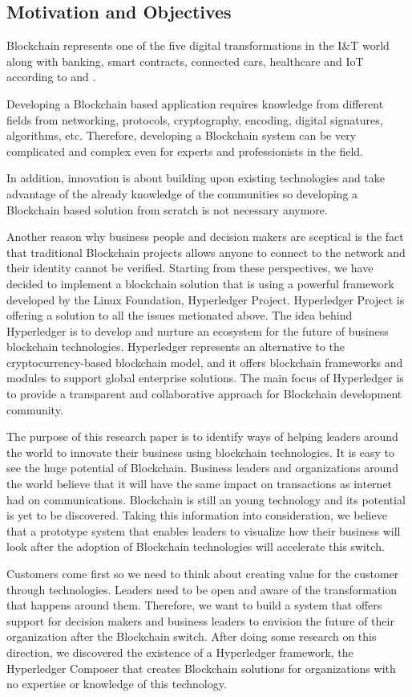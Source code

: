 \subsection{Motivation and Objectives}
\label{sub-sec:intro-subsection3}
Blockchain represents one of the five digital transformations in the I\&T world along with banking, smart contracts, connected cars, healthcare and IoT according to \cite{appblockch} and \cite{appblockch2}.

Developing a Blockchain based application requires knowledge from different fields from networking, protocols, cryptography, encoding, digital signatures, algorithms, etc. Therefore, developing a Blockchain system can be very complicated and complex even for experts and professionists in the field.

In addition, innovation is about building upon existing technologies and take advantage of the already knowledge of the communities so developing a Blockchain based solution from scratch is not necessary anymore. 

Another reason why business people and decision makers are sceptical is the fact that traditional Blockchain projects allows anyone to connect to the network and their identity cannot be verified. 
Starting from these perspectives, we have decided to implement a blockchain solution that is using a powerful framework developed by the Linux Foundation, Hyperledger Project.
Hyperledger Project is offering a solution to all the issues metionated above. The idea behind Hyperledger is to develop and nurture an ecosystem for the future of business blockchain technologies.
Hyperledger represents an alternative to the cryptocurrency-based blockchain model, and it offers blockchain frameworks and modules to support global enterprise solutions. The main focus of Hyperledger is to provide a transparent and collaborative approach for Blockchain development community.

The purpose of this research paper is to identify ways of helping leaders around the world to innovate their business using blockchain technologies. 
It is easy to see the huge potential of Blockchain. Business leaders and organizations around the world believe that it will have the same impact on transactions as internet had on communications. Blockchain is still an young technology and its potential is yet to be discovered.
Taking this information into consideration, we believe that a prototype system that enables leaders to visualize how their business will look after the adoption of Blockchain technologies will accelerate this switch.

Customers come first so we need to think about creating value for the customer through technologies. Leaders need to be open and aware of the transformation that happens around them. Therefore, we want to build a system that offers support for decision makers and business leaders to envision the future of their organization after the Blockchain switch. 
After doing some research on this direction, we discovered the existence of a Hyperledger framework, the Hyperledger Composer that creates Blockchain solutions for organizations with no expertise or knowledge of this technology.
